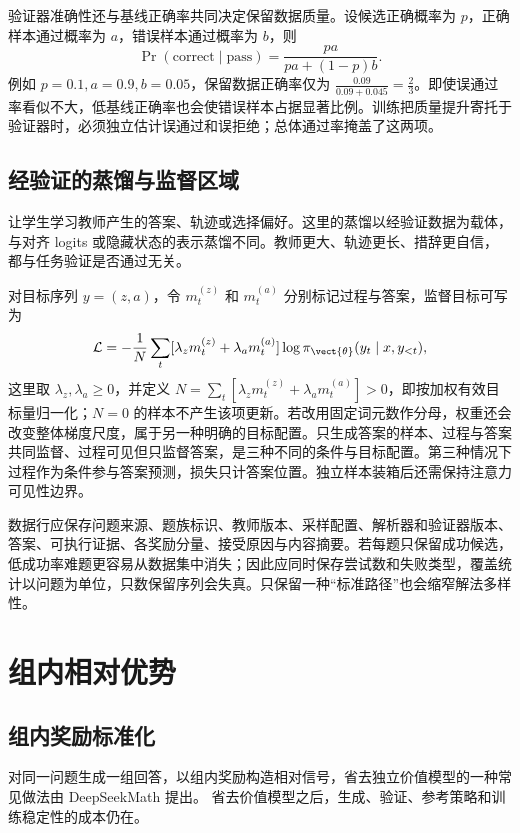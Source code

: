 \documentclass[../textbook.tex]{subfiles}
\begin{document}
验证器准确性还与基线正确率共同决定保留数据质量。设候选正确概率为 $p$，正确样本通过概率为 $a$，错误样本通过概率为 $b$，则
\begin{equation}
 \Pr(\mathrm{correct}\mid\mathrm{pass})=
 \frac{pa}{pa+(1-p)b}.
\end{equation}
例如 $p=0.1,a=0.9,b=0.05$，保留数据正确率仅为 $\frac{0.09}{0.09+0.045}=\frac{2}{3}$。即使误通过率看似不大，低基线正确率也会使错误样本占据显著比例。训练把质量提升寄托于验证器时，必须独立估计误通过和误拒绝；总体通过率掩盖了这两项。

\subsection{经验证的蒸馏与监督区域}
让学生学习教师产生的答案、轨迹或选择偏好。这里的蒸馏以经验证数据为载体，与对齐 logits 或隐藏状态的表示蒸馏不同。教师更大、轨迹更长、措辞更自信，都与任务验证是否通过无关。

对目标序列 $y=(z,a)$，令 $m_t^{(z)}$ 和 $m_t^{(a)}$ 分别标记过程与答案，监督目标可写为
\begin{equation}
 \mathcal L=-\frac1N\sum_t
 [\lambda_zm_t^{(z)}+\lambda_am_t^{(a)}]
 \log\pi_{\vect{\theta}}(y_t\mid x,y_{<t}),
\end{equation}
这里取 $\lambda_z,\lambda_a\ge0$，并定义 $N=\sum_t[\lambda_zm_t^{(z)}+\lambda_am_t^{(a)}]>0$，即按加权有效目标量归一化；$N=0$ 的样本不产生该项更新。若改用固定词元数作分母，权重还会改变整体梯度尺度，属于另一种明确的目标配置。只生成答案的样本、过程与答案共同监督、过程可见但只监督答案，是三种不同的条件与目标配置。第三种情况下过程作为条件参与答案预测，损失只计答案位置。独立样本装箱后还需保持注意力可见性边界。

数据行应保存问题来源、题族标识、教师版本、采样配置、解析器和验证器版本、答案、可执行证据、各奖励分量、接受原因与内容摘要。若每题只保留成功候选，低成功率难题更容易从数据集中消失；因此应同时保存尝试数和失败类型，覆盖统计以问题为单位，只数保留序列会失真。只保留一种“标准路径”也会缩窄解法多样性。

\section{组内相对优势}

\subsection{组内奖励标准化}
对同一问题生成一组回答，以组内奖励构造相对信号，省去独立价值模型的一种常见做法由 DeepSeekMath 提出。\cite{shao2024deepseekmath} 省去价值模型之后，生成、验证、参考策略和训练稳定性的成本仍在。
\end{document}
